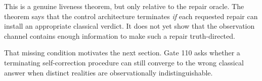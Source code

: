 This is a genuine liveness theorem, but only relative to the repair oracle. The theorem says that the control architecture terminates \emph{if} each requested repair can install an appropriate classical verdict. It does not yet show that the observation channel contains enough information to make such a repair truth-directed.

That missing condition motivates the next section. Gate 110 asks whether a terminating self-correction procedure can still converge to the wrong classical answer when distinct realities are observationally indistinguishable.

